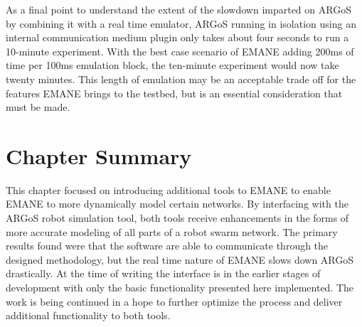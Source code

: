 As a final point to understand the extent of the slowdown imparted on ARGoS by combining it with a real time emulator, ARGoS running in isolation using an internal communication medium plugin only takes about four seconds to run a 10-minute experiment.
With the best case scenario of EMANE adding 200ms of time per 100ms emulation block, the ten-minute experiment would now take twenty minutes.
This length of emulation may be an acceptable trade off for the features EMANE brings to the testbed, but is an essential consideration that must be made.

\section{Chapter Summary}
This chapter focused on introducing additional tools to EMANE to enable EMANE to more dynamically model certain networks.
By interfacing with the ARGoS robot simulation tool, both tools receive enhancements in the forms of more accurate modeling of all parts of a robot swarm network.
The primary results found were that the software are able to communicate through the designed methodology, but the real time nature of EMANE slows down ARGoS drastically.
At the time of writing the interface is in the earlier stages of development with only the basic functionality presented here implemented.
The work is being continued in a hope to further optimize the process and deliver additional functionality to both tools.
